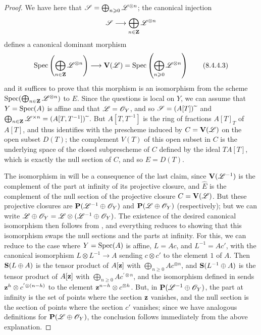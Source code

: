 \begin{proof}
We have here that $\mathscr{S}=\bigoplus_{n\geqslant0}\mathscr{L}^{\otimes n}$;
the canonical injection
\[
  \sh{S} \to \bigoplus_{n\in\bb{Z}} \sh{L}^{\otimes n}
\]
defines a canonical dominant morphism
\[
\label{eq:2.8.4.4.3}
  \Spec\left(
    \bigoplus_{n\in\bb{Z}} \sh{L}^{\otimes n}
  \right)
  \to
  \bb{V}(\sh{L})
  =
  \Spec\left(
    \bigoplus_{n\geq0} \sh{L}^{\otimes n}
  \right)
\tag{8.4.4.3}
\]
and it suffices to prove that this morphism is an isomorphism from the scheme $\operatorname{Spec}(\bigoplus_{n\in\mathbf{Z}} \mathscr{L}^{\otimes n})$ to $E$.
Since the questions is local on $Y$, we can assume that $Y=\operatorname{Spec}(A)$ is affine
and that $\mathscr{L}=\mathscr{O}_Y$, and so $\mathscr{S}=(A[T]){\,\widetilde{\,}\,}$ and $\bigoplus_{n\in\mathbf{Z}}\mathscr{L}^{\times n} = (A[T,T^{-1}]){\,\widetilde{\,}\,}$.
But $A[T,T^{-1}]$ is the ring of fractions $A[T]_T$ of $A[T]$, and thus  identifies  with the prescheme induced by $C=\mathbf{V}(\mathscr{L})$ on the open subset $D(T)$;
the complement $V(T)$ of this open subset in $C$ is the underlying space of the closed subprescheme of $C$ defined by the ideal $TA[T]$, which is exactly the null section of $C$, and so $E=D(T)$.

The isomorphism in  will be a consequence of the last claim, since $\mathbf{V}(\mathscr{L}^{-1})$ is the complement of the part at infinity of its projective closure, and $\widehat{E}$ is the complement of the null section of the projective closure $C=\mathbf{V}(\mathscr{L})$.
But these projective closures are $\mathbf{P}(\mathscr{L}^{-1}\oplus\mathscr{O}_Y)$ and $\mathbf{P}(\mathscr{L}\oplus\mathscr{O}_Y)$ (respectively);
but we can write $\mathscr{L}\oplus\mathscr{O}_Y = \mathscr{L}\otimes(\mathscr{L}^{-1}\oplus\mathscr{O}_Y)$.
The existence of the desired canonical isomorphism then follows from , and everything reduces to showing that this isomorphism swaps the null sections and the parts at infinity.
For this, we can reduce to the case where $Y=\operatorname{Spec}(A)$ is affine, $L=Ac$, and $L^{-1}=Ac'$, with the canonical isomorphism $L\otimes L^{-1}\to A$ sending $c\otimes c'$ to the element $1$ of $A$.
Then $\mathbf{S}(L\oplus A)$ is the tensor product of $A[\mathbf{z}]$ with $\bigoplus_{n\geq0}Ac^{\otimes n}$, and $\mathbf{S}(L^{-1}\oplus A)$ is the tensor product of $A[\mathbf{z}]$ with $\bigoplus_{n\geq0}Ac^{'\otimes n}$, and the isomorphism defined in  sends $\mathbf{z}^h\otimes c^{'\otimes(n-h)}$ to the element $\mathbf{z}^{n-h}\otimes c^{\otimes h}$.
But, in $\mathbf{P}(\mathscr{L}^{-1}\oplus\mathscr{O}_Y)$, the part at infinity is the set of points where the section $\mathbf{z}$ vanishes, and the null section is the section of points where the section $c'$ vanishes;
since we have analogous definitions for $\mathbf{P}(\mathscr{L}\oplus\mathscr{O}_Y)$, the conclusion follows immediately from the above explanation.
\end{proof}


